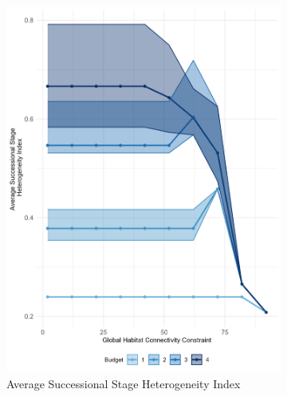 \begin{figure}[h]
\begin{subfigure}[b]{.48\textwidth}
        \includegraphics[height = .3\textheight]{figures/wildland/average_het.jpg}
        \caption{Average Successional Stage Heterogeneity Index}
        \label{fig:het}
    \end{subfigure}
       \vspace{1em} %
    \begin{subfigure}[b]{.48\textwidth}
        \centering

\end{subfigure}
\end{figure}
